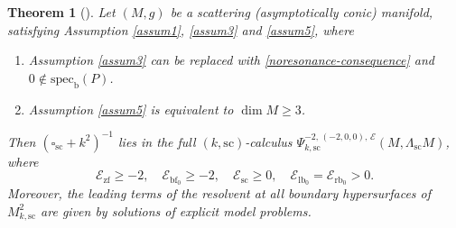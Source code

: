 \documentclass[JEP,XML,SOM,Unicode,NoFloatCountersInSection,published]{cedram}
\theoremstyle{plain}
\newtheorem{Th}{Theorem}[section]
\theoremstyle{definition}
\newcommand{\bb}{{\mathrm{b}}}
\newcommand{\lfz}{{\mathrm{lb}_0}}
\newcommand{\rfz}{{\mathrm{rb}_0}}
\newcommand{\bbf}{{\mathrm{bf}}}
\newcommand{\bfz}{{\bbf_0}}
\newcommand{\ssc}{{\mathrm{sc}}}
\newcommand{\zf}{{\mathrm{zf}}}
\newcommand{\specb}{\mathrm{spec}_\bb}
\begin{document}
\begin{Th}[{\cite[Th.\,18]{guillarmou2014low}}] \label{initial ACM}
Let $(M,g)$ be a scattering (asymptotically conic) manifold, satisfying
Assumption \ref{assum1}, \ref{assum3} and \ref{assum5}, where
\begin{enumerate}
\item Assumption \ref{assum3} can be replaced with \eqref{noresonance-consequence} and
$0 \notin \specb(P)$.
\item Assumption \ref{assum5} is equivalent to $\dim M \geq 3$.
\end{enumerate}
Then $(\square_{\ssc} + k^{2})^{-1}$
lies in the full $(k,\ssc)$-calculus $\Psi_{k,\ssc}^{-2, \,(-2,0,0),\,\mathcal{E}}(M,\Lambda_\ssc M)$,
where
\[
\mathcal{E}_{\zf} \geq -2,
\quad \mathcal{E}_{\bfz} \geq -2, \quad \mathcal{E}_{\ssc} \geq 0, \quad\mathcal{E}_{\lfz} = \mathcal{E}_{\rfz} >0.
\]
Moreover, the leading terms of the resolvent at all boundary
hypersurfaces of $M^2_{k,\ssc}$ are given by solutions of explicit model problems.
\end{Th}
\end{document}
